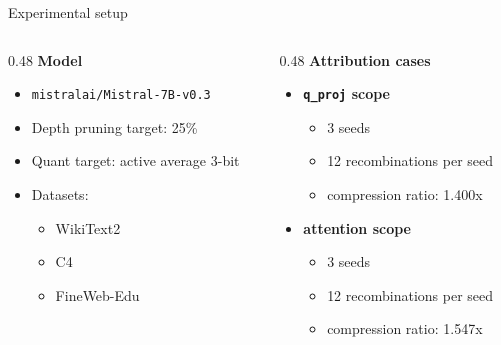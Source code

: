 \documentclass[aspectratio=169]{beamer}
\begin{document}
\begin{frame}{Experimental setup}
\begin{columns}[T]
\begin{column}{0.48\textwidth}
\textbf{Model}
\begin{itemize}
    \item \texttt{mistralai/Mistral-7B-v0.3}
    \item Depth pruning target: 25\%
    \item Quant target: active average 3-bit
    \item Datasets:
    \begin{itemize}
        \item WikiText2
        \item C4
        \item FineWeb-Edu
    \end{itemize}
\end{itemize}
\end{column}

\begin{column}{0.48\textwidth}
\textbf{Attribution cases}
\begin{itemize}
    \item \textbf{\texttt{q\_proj} scope}
    \begin{itemize}
        \item 3 seeds
        \item 12 recombinations per seed
        \item compression ratio: 1.400x
    \end{itemize}
    \item \textbf{attention scope}
    \begin{itemize}
        \item 3 seeds
        \item 12 recombinations per seed
        \item compression ratio: 1.547x
    \end{itemize}
\end{itemize}
\end{column}
\end{columns}
\end{frame}

\end{document}
